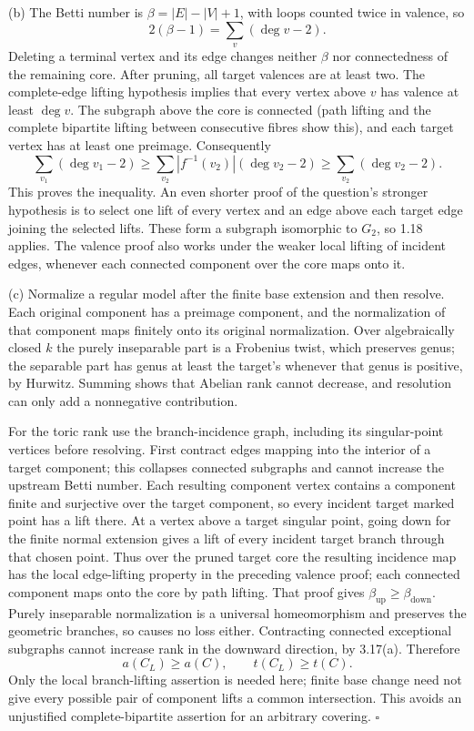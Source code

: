 \documentclass[11pt]{article}
\begin{document}
(b) The Betti number is $\beta=|E|-|V|+1$, with loops counted twice in valence, so
\[ 2(\beta-1)=\sum_v(\deg v-2). \]
Deleting a terminal vertex and its edge changes neither $\beta$ nor connectedness of the remaining core. After pruning, all target valences are at least two. The complete-edge lifting hypothesis implies that every vertex above $v$ has valence at least $\deg v$. The subgraph above the core is connected (path lifting and the complete bipartite lifting between consecutive fibres show this), and each target vertex has at least one preimage. Consequently
\[ \sum_{v_1}(\deg v_1-2)\ge
\sum_{v_2}|f^{-1}(v_2)|(\deg v_2-2)
\ge\sum_{v_2}(\deg v_2-2). \]
This proves the inequality. An even shorter proof of the question's stronger hypothesis is to select one lift of every vertex and an edge above each target edge joining the selected lifts. These form a subgraph isomorphic to $G_2$, so 1.18 applies. The valence proof also works under the weaker local lifting of incident edges, whenever each connected component over the core maps onto it.

(c) Normalize a regular model after the finite base extension and then resolve. Each original component has a preimage component, and the normalization of that component maps finitely onto its original normalization. Over algebraically closed $k$ the purely inseparable part is a Frobenius twist, which preserves genus; the separable part has genus at least the target's whenever that genus is positive, by Hurwitz. Summing shows that Abelian rank cannot decrease, and resolution can only add a nonnegative contribution.

For the toric rank use the branch-incidence graph, including its singular-point vertices before resolving. First contract edges mapping into the interior of a target component; this collapses connected subgraphs and cannot increase the upstream Betti number. Each resulting component vertex contains a component finite and surjective over the target component, so every incident target marked point has a lift there. At a vertex above a target singular point, going down for the finite normal extension gives a lift of every incident target branch through that chosen point. Thus over the pruned target core the resulting incidence map has the local edge-lifting property in the preceding valence proof; each connected component maps onto the core by path lifting. That proof gives $\beta_{\mathrm{up}}\ge\beta_{\mathrm{down}}$. Purely inseparable normalization is a universal homeomorphism and preserves the geometric branches, so causes no loss either. Contracting connected exceptional subgraphs cannot increase rank in the downward direction, by 3.17(a). Therefore
\[ a(C_L)\ge a(C),\qquad t(C_L)\ge t(C). \]
Only the local branch-lifting assertion is needed here; finite base change need not give every possible pair of component lifts a common intersection. This avoids an unjustified complete-bipartite assertion for an arbitrary covering. \hfill$\square$
\end{document}
